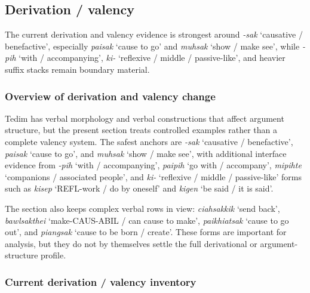 \documentclass[
  11pt,
  a4paper,
]{article}
\newcommand{\tdim}[1]{\textit{#1}}
\newcommand{\glossquote}[1]{`#1'}
\begin{document}
\subsection{Derivation / valency}\label{derivation-valency}

The current derivation and valency evidence is strongest around
\tdim{-sak} \glossquote{causative / benefactive}, especially
\tdim{paisak} \glossquote{cause to go} and \tdim{muhsak}
\glossquote{show / make see}, while \tdim{-pih}
\glossquote{with / accompanying}, \tdim{ki-}
\glossquote{reflexive / middle / passive-like}, and heavier suffix
stacks remain boundary material.

\subsubsection{Overview of derivation and valency
change}\label{overview-of-derivation-and-valency-change}

Tedim has verbal morphology and verbal constructions that affect
argument structure, but the present section treats controlled examples
rather than a complete valency system. The safest anchors are
\tdim{-sak} \glossquote{causative / benefactive}, \tdim{paisak}
\glossquote{cause to go}, and \tdim{muhsak}
\glossquote{show / make see}, with additional interface evidence from
\tdim{-pih} \glossquote{with / accompanying}, \tdim{paipih}
\glossquote{go with / accompany}, \tdim{mipihte}
\glossquote{companions / associated people}, and \tdim{ki-}
\glossquote{reflexive / middle / passive-like} forms such as
\tdim{kisep} \glossquote{REFL-work / do by oneself} and \tdim{kigen}
\glossquote{be said / it is said}.

The section also keeps complex verbal rows in view: \tdim{ciahsakkik}
\glossquote{send back}, \tdim{bawlsakthei}
\glossquote{make-CAUS-ABIL / can cause to make}, \tdim{paikhiatsak}
\glossquote{cause to go out}, and \tdim{piangsak}
\glossquote{cause to be born / create}. These forms are important for
analysis, but they do not by themselves settle the full derivational or
argument-structure profile.

\subsubsection{Current derivation / valency
inventory}\label{current-derivation-valency-inventory}
\end{document}
